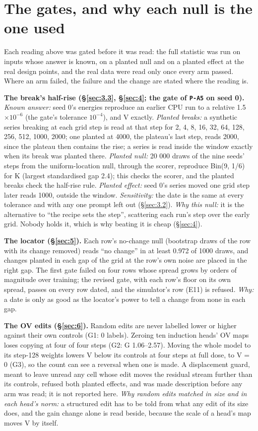 \documentclass[11pt]{article}
\begin{document}
\section{The gates, and why each null is the one used}\label{sec:B}

Each reading above was gated before it was read: the full statistic was run on inputs whose answer is known, on a planted null and on a planted effect at the real design points, and the real data were read only once every arm passed. Where an arm failed, the failure and the change are stated where the reading is.

\textbf{The break's half-rise (\S\ref{sec:3.3}, \S\ref{sec:4}; the gate of \texttt{P-A5} on seed 0).} \emph{Known answer:} seed 0's energies reproduce an earlier CPU run to a relative 1.5 $\times 10^{-6}$ (the gate's tolerance $10^{-4}$), and V exactly. \emph{Planted breaks:} a synthetic series breaking at each grid step is read at that step for 2, 4, 8, 16, 32, 64, 128, 256, 512, 1000, 2000; one planted at 4000, the plateau's last step, reads 2000, since the plateau then contains the rise; a series is read inside the window exactly when its break was planted there. \emph{Planted null:} 20 000 draws of the nine seeds' steps from the uniform-location null, through the scorer, reproduce Bin(9, 1/6) for K (largest standardised gap 2.4); this checks the scorer, and the planted breaks check the half-rise rule. \emph{Planted effect:} seed 0's series moved one grid step later reads 1000, outside the window. \emph{Sensitivity:} the date is the same at every tolerance and with any one prompt left out (\S\ref{sec:3.2}). \emph{Why this null:} it is the alternative to ``the recipe sets the step'', scattering each run's step over the early grid. Nobody holds it, which is why beating it is cheap (\S\ref{sec:4}).

\textbf{The locator (\S\ref{sec:5}).} Each row's no-change null (bootstrap draws of the row with its change removed) reads ``no change'' in at least 0.972 of 1000 draws, and changes planted in each gap of the grid at the row's own noise are placed in the right gap. The first gate failed on four rows whose spread grows by orders of magnitude over training; the revised gate, with each row's floor on its own spread, passes on every row dated, and the simulator's row (E11) is refused. \emph{Why:} a date is only as good as the locator's power to tell a change from none in each gap.

\textbf{The OV edits (\S\ref{sec:6}).} Random edits are never labelled lower or higher against their own controls (G1: 0 labels). Zeroing ten induction heads' OV maps loses copying at four of four steps (G2: G 1.06--2.57). Moving the whole model to its step-128 weights lowers V below its controls at four steps at full dose, to V = 0 (G3), so the count can see a reversal when one is made. A displacement guard, meant to leave unread any cell whose edit moves the residual stream further than its controls, refused both planted effects, and was made description before any arm was read; it is not reported here. \emph{Why random edits matched in size and in each head's norm:} a structured edit has to be told from what any edit of its size does, and the gain change alone is read beside, because the scale of a head's map moves V by itself.
\end{document}
